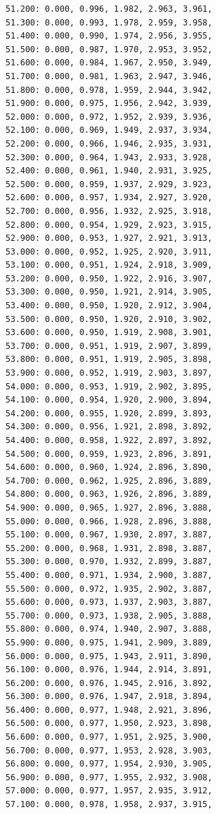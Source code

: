\documentclass[12pt, a4paper]{article}
\begin{document}
\begin{scriptsize}
\begin{ttfamily}
\begin{lstlisting}
51.200: 0.000, 0.996, 1.982, 2.963, 3.961, 
51.300: 0.000, 0.993, 1.978, 2.959, 3.958, 
51.400: 0.000, 0.990, 1.974, 2.956, 3.955, 
51.500: 0.000, 0.987, 1.970, 2.953, 3.952, 
51.600: 0.000, 0.984, 1.967, 2.950, 3.949, 
51.700: 0.000, 0.981, 1.963, 2.947, 3.946, 
51.800: 0.000, 0.978, 1.959, 2.944, 3.942, 
51.900: 0.000, 0.975, 1.956, 2.942, 3.939, 
52.000: 0.000, 0.972, 1.952, 2.939, 3.936, 
52.100: 0.000, 0.969, 1.949, 2.937, 3.934, 
52.200: 0.000, 0.966, 1.946, 2.935, 3.931, 
52.300: 0.000, 0.964, 1.943, 2.933, 3.928, 
52.400: 0.000, 0.961, 1.940, 2.931, 3.925, 
52.500: 0.000, 0.959, 1.937, 2.929, 3.923, 
52.600: 0.000, 0.957, 1.934, 2.927, 3.920, 
52.700: 0.000, 0.956, 1.932, 2.925, 3.918, 
52.800: 0.000, 0.954, 1.929, 2.923, 3.915, 
52.900: 0.000, 0.953, 1.927, 2.921, 3.913, 
53.000: 0.000, 0.952, 1.925, 2.920, 3.911, 
53.100: 0.000, 0.951, 1.924, 2.918, 3.909, 
53.200: 0.000, 0.950, 1.922, 2.916, 3.907, 
53.300: 0.000, 0.950, 1.921, 2.914, 3.905, 
53.400: 0.000, 0.950, 1.920, 2.912, 3.904, 
53.500: 0.000, 0.950, 1.920, 2.910, 3.902, 
53.600: 0.000, 0.950, 1.919, 2.908, 3.901, 
53.700: 0.000, 0.951, 1.919, 2.907, 3.899, 
53.800: 0.000, 0.951, 1.919, 2.905, 3.898, 
53.900: 0.000, 0.952, 1.919, 2.903, 3.897, 
54.000: 0.000, 0.953, 1.919, 2.902, 3.895, 
54.100: 0.000, 0.954, 1.920, 2.900, 3.894, 
54.200: 0.000, 0.955, 1.920, 2.899, 3.893, 
54.300: 0.000, 0.956, 1.921, 2.898, 3.892, 
54.400: 0.000, 0.958, 1.922, 2.897, 3.892, 
54.500: 0.000, 0.959, 1.923, 2.896, 3.891, 
54.600: 0.000, 0.960, 1.924, 2.896, 3.890, 
54.700: 0.000, 0.962, 1.925, 2.896, 3.889, 
54.800: 0.000, 0.963, 1.926, 2.896, 3.889, 
54.900: 0.000, 0.965, 1.927, 2.896, 3.888, 
55.000: 0.000, 0.966, 1.928, 2.896, 3.888, 
55.100: 0.000, 0.967, 1.930, 2.897, 3.887, 
55.200: 0.000, 0.968, 1.931, 2.898, 3.887, 
55.300: 0.000, 0.970, 1.932, 2.899, 3.887, 
55.400: 0.000, 0.971, 1.934, 2.900, 3.887, 
55.500: 0.000, 0.972, 1.935, 2.902, 3.887, 
55.600: 0.000, 0.973, 1.937, 2.903, 3.887, 
55.700: 0.000, 0.973, 1.938, 2.905, 3.888, 
55.800: 0.000, 0.974, 1.940, 2.907, 3.888, 
55.900: 0.000, 0.975, 1.941, 2.909, 3.889, 
56.000: 0.000, 0.975, 1.943, 2.911, 3.890, 
56.100: 0.000, 0.976, 1.944, 2.914, 3.891, 
56.200: 0.000, 0.976, 1.945, 2.916, 3.892, 
56.300: 0.000, 0.976, 1.947, 2.918, 3.894, 
56.400: 0.000, 0.977, 1.948, 2.921, 3.896, 
56.500: 0.000, 0.977, 1.950, 2.923, 3.898, 
56.600: 0.000, 0.977, 1.951, 2.925, 3.900, 
56.700: 0.000, 0.977, 1.953, 2.928, 3.903, 
56.800: 0.000, 0.977, 1.954, 2.930, 3.905, 
56.900: 0.000, 0.977, 1.955, 2.932, 3.908, 
57.000: 0.000, 0.977, 1.957, 2.935, 3.912, 
57.100: 0.000, 0.978, 1.958, 2.937, 3.915, 

\end{lstlisting}
\end{ttfamily}
\end{scriptsize}
\end{document}
